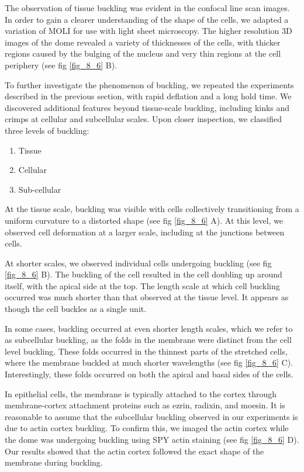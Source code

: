The observation of tissue buckling was evident in the confocal line scan images. In order to gain a clearer understanding of the shape of the cells, we adapted a variation of MOLI for use with light sheet microscopy. The higher resolution 3D images of the dome revealed a variety of thicknesses of the cells, with thicker regions caused by the bulging of the nucleus and very thin regions at the cell periphery (see fig \ref{fig_8_6} B).

To further investigate the phenomenon of buckling, we repeated the experiments described in the previous section, with rapid deflation and a long hold time. We discovered additional features beyond tissue-scale buckling, including kinks and crimps at cellular and subcellular scales. Upon closer inspection, we classified three levels of buckling:

\begin{enumerate}
	\item Tissue
	\item Cellular
	\item Sub-cellular
\end{enumerate}

At the tissue scale, buckling was visible with cells collectively transitioning from a uniform curvature to a distorted shape (see fig \ref{fig_8_6} A). At this level, we observed cell deformation at a larger scale, including at the junctions between cells.

At shorter scales, we observed individual cells undergoing buckling (see fig \ref{fig_8_6} B). The buckling of the cell resulted in the cell doubling up around itself, with the apical side at the top. The length scale at which cell buckling occurred was much shorter than that observed at the tissue level. It appears as though the cell buckles as a single unit.

In some cases, buckling occurred at even shorter length scales, which we refer to as subcellular buckling, as the folds in the membrane were distinct from the cell level buckling. These folds occurred in the thinnest parts of the stretched cells, where the membrane buckled at much shorter wavelengths (see fig \ref{fig_8_6} C). Interestingly, these folds occurred on both the apical and basal sides of the cells.

In epithelial cells, the membrane is typically attached to the cortex through membrane-cortex attachment proteins such as ezrin, radixin, and moesin. It is reasonable to assume that the subcellular buckling observed in our experiments is due to actin cortex buckling. To confirm this, we imaged the actin cortex while the dome was undergoing buckling using SPY actin staining (see fig \ref{fig_8_6} D). Our results showed that the actin cortex followed the exact shape of the membrane during buckling.

